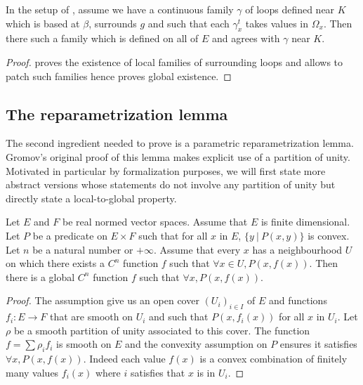 \documentclass[10pt,a4paper]{article}
\newcommand{\co}{\!:}
\newcommand{\C}{C} %
\newcommand{\uses}[1]{}
\newcommand{\lean}[1]{}
\newcommand{\leanok}{}
\begin{document}
\begin{lemma}
  \label{lem:∃_surrounding_loops}
  \lean{exists_surrounding_loops}
  \leanok
  In the setup of , assume we have a
  continuous family $γ$ of loops defined near $K$ which is based at $β$,
  surrounds $g$ and such that each $γ_x^t$ takes values in $Ω_x$.
  Then there such a family which is defined on all of $E$ and agrees
  with $γ$ near $K$.
\end{lemma}

\begin{proof}
  \uses{lem:local_loops, cor:extend_loops, lem:relative_inductive_construction_of_loc}
  \leanok
   proves the existence of local families of surrounding
  loops and  allows to patch such families hence
   proves global existence.
\end{proof}

\subsection{The reparametrization lemma}
\label{sub:the_reparametrization_lemma}

The second ingredient needed to prove  is a
parametric reparametrization lemma. Gromov's original proof of this lemma makes
explicit use of a partition of unity. Motivated in particular by formalization
purposes, we will first state more abstract versions whose statements do not involve
any partition of unity but directly state a local-to-global property.

\begin{lemma}
  \label{lem:exists_cont_diff_of_convex}
  \lean{exists_contDiff_of_convex}
  \leanok
  Let $E$ and $F$ be real normed vector spaces. Assume that $E$ is finite
  dimensional. Let $P$ be a predicate on $E \times F$ such that for all $x$ in
  $E$, $\{y ~|~ P (x, y) \}$ is convex. Let $n$ be a natural number or $+\infty$.
  Assume that every $x$ has a neighbourhood $U$ on which there exists a $\C^n$
  function $f$ such that $\forall x ∈ U, P(x, f(x))$. Then there is a global
  $\C^n$ function $f$ such that $\forall x, P(x, f(x))$.
\end{lemma}

\begin{proof}
  \leanok
  The assumption give us an open cover $(U_i)_{i ∈ I}$ of $E$ and functions
  $f_i \co E → F$ that are smooth on $U_i$ and such that $P(x, f_i(x))$ for all $x$ in $U_i$.
  Let $ρ$ be a smooth partition of unity associated to this cover. The function
  $f = ∑ ρ_i f_i$ is smooth on $E$ and the convexity assumption on $P$ ensures
  it satisfies $\forall x, P(x, f(x))$. Indeed each value $f(x)$ is a convex combination
  of finitely many values $f_i(x)$ where $i$ satisfies that $x$ is in $U_i$.
\end{proof}
\end{document}
